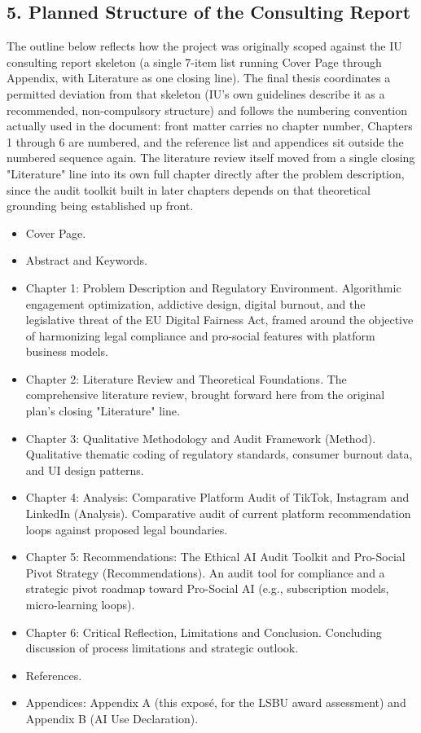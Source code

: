\documentclass[11pt]{article}
\begin{document}
\subsection*{5. Planned Structure of the Consulting Report}
The outline below reflects how the project was originally scoped against the IU consulting report skeleton (a single 7-item list running Cover Page through Appendix, with Literature as one closing line). The final thesis coordinates a permitted deviation from that skeleton (IU's own guidelines describe it as a recommended, non-compulsory structure) and follows the numbering convention actually used in the document: front matter carries no chapter number, Chapters 1 through 6 are numbered, and the reference list and appendices sit outside the numbered sequence again. The literature review itself moved from a single closing "Literature" line into its own full chapter directly after the problem description, since the audit toolkit built in later chapters depends on that theoretical grounding being established up front.
\begin{itemize}
\item Cover Page.
\item Abstract and Keywords.
\item Chapter 1: Problem Description and Regulatory Environment. Algorithmic engagement optimization, addictive design, digital burnout, and the legislative threat of the EU Digital Fairness Act, framed around the objective of harmonizing legal compliance and pro-social features with platform business models.
\item Chapter 2: Literature Review and Theoretical Foundations. The comprehensive literature review, brought forward here from the original plan's closing "Literature" line.
\item Chapter 3: Qualitative Methodology and Audit Framework (Method). Qualitative thematic coding of regulatory standards, consumer burnout data, and UI design patterns.
\item Chapter 4: Analysis: Comparative Platform Audit of TikTok, Instagram and LinkedIn (Analysis). Comparative audit of current platform recommendation loops against proposed legal boundaries.
\item Chapter 5: Recommendations: The Ethical AI Audit Toolkit and Pro-Social Pivot Strategy (Recommendations). An audit tool for compliance and a strategic pivot roadmap toward Pro-Social AI (e.g., subscription models, micro-learning loops).
\item Chapter 6: Critical Reflection, Limitations and Conclusion. Concluding discussion of process limitations and strategic outlook.
\item References.
\item Appendices: Appendix A (this expos\'e, for the LSBU award assessment) and Appendix B (AI Use Declaration).
\end{itemize}
\end{document}
